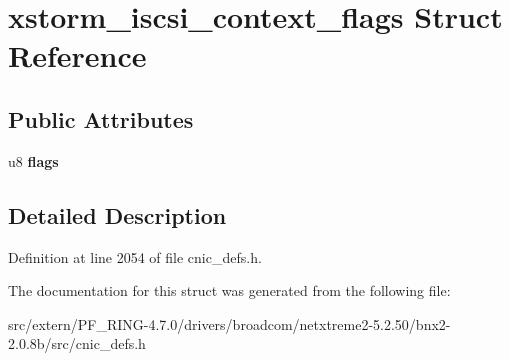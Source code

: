 \hypertarget{structxstorm__iscsi__context__flags}{
\section{xstorm\_\-iscsi\_\-context\_\-flags Struct Reference}
\label{structxstorm__iscsi__context__flags}
}
\subsection*{Public Attributes}
\begin{DoxyCompactItemize}
\item 
\hypertarget{structxstorm__iscsi__context__flags_a6a394ead91509a668825413a5d0276b7}{
u8 {\bfseries flags}}
\label{structxstorm__iscsi__context__flags_a6a394ead91509a668825413a5d0276b7}

\end{DoxyCompactItemize}


\subsection{Detailed Description}


Definition at line 2054 of file cnic\_\-defs.h.



The documentation for this struct was generated from the following file:\begin{DoxyCompactItemize}
\item 
src/extern/PF\_\-RING-\/4.7.0/drivers/broadcom/netxtreme2-\/5.2.50/bnx2-\/2.0.8b/src/cnic\_\-defs.h\end{DoxyCompactItemize}
